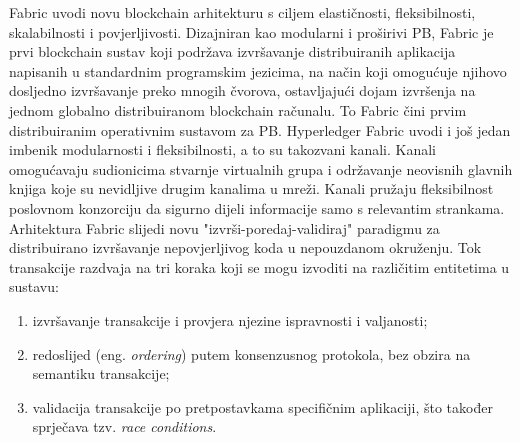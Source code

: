 \documentclass[times, utf8, diplomski]{fer}
\begin{document}
Fabric uvodi novu blockchain arhitekturu s ciljem elastičnosti, fleksibilnosti, skalabilnosti i povjerljivosti. Dizajniran kao modularni i proširivi PB, Fabric je prvi blockchain sustav koji podržava izvršavanje distribuiranih aplikacija napisanih u standardnim programskim jezicima, na način koji omogućuje njihovo dosljedno izvršavanje preko mnogih čvorova, ostavljajući dojam izvršenja na jednom globalno distribuiranom blockchain
računalu. To Fabric čini prvim distribuiranim operativnim sustavom za PB.
Hyperledger Fabric uvodi i još jedan imbenik modularnosti i fleksibilnosti, a to su takozvani kanali. Kanali omogućavaju sudionicima stvarnje virtualnih grupa i održavanje neovisnih glavnih knjiga koje su nevidljive drugim kanalima u mreži. Kanali pružaju fleksibilnost poslovnom konzorciju da sigurno dijeli informacije samo s relevantim strankama.
Arhitektura Fabric slijedi novu "izvrši-poredaj-validiraj" paradigmu za distribuirano izvršavanje nepovjerljivog koda u nepouzdanom okruženju. Tok transakcije razdvaja na tri koraka koji se mogu izvoditi na različitim entitetima u sustavu:

\begin{enumerate}

\item izvršavanje transakcije i provjera njezine ispravnosti i valjanosti;

\item redoslijed (eng.  \textit{ordering}) putem konsenzusnog protokola, bez obzira na semantiku transakcije;

\item validacija transakcije po pretpostavkama specifičnim aplikaciji, što također sprječava tzv.  \textit{race conditions}.

\end{enumerate}
\end{document}
